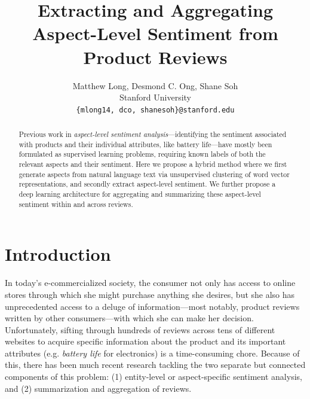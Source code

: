 \documentclass{article} %
\title{  Extracting and Aggregating Aspect-Level Sentiment from Product Reviews  }
\author{
Matthew Long, Desmond C. Ong, Shane Soh \\
Stanford University \\
\texttt{\{mlong14, dco, shanesoh\}@stanford.edu}
}
\begin{document}
\maketitle

\begin{abstract}
Previous work in \textit{aspect-level sentiment analysis}---identifying the sentiment associated with products and their individual attributes, like battery life---have mostly been formulated as supervised learning problems, requiring known labels of both the relevant aspects and their sentiment. Here we propose a hybrid method where we first generate aspects from natural language text via unsupervised clustering of word vector representations, and secondly extract aspect-level sentiment. We further propose a deep learning architecture for aggregating and summarizing these aspect-level sentiment within and across reviews.
\end{abstract}

\section{Introduction}

In today's e-commercialized society, the consumer not only has access to online stores through which she might purchase anything she desires, but she also has unprecedented access to a deluge of information---most notably, product reviews written by other consumers---with which she can make her decision. Unfortunately, sifting through hundreds of reviews across tens of different websites to acquire specific information about the product and its important attributes (e.g. \textit{battery life} for electronics) is a time-consuming chore. Because of this, there has been much recent research tackling the two separate but connected components of this problem: (1) entity-level or aspect-specific sentiment analysis, and (2) summarization and aggregation of reviews.
\end{document}
